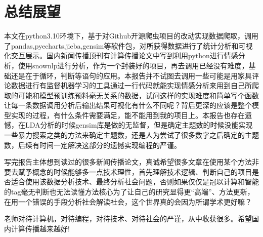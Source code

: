 \section{总结展望}
\par{本文在python3.10环境下，基于对Github开源爬虫项目的改动实现数据爬取，调用了pandas,pyecharts,jieba,gensim等软件包，对所获得数据进行了统计分析和可视化交互展示。国内新闻传播顶刊有计算传播论文中写到利用python进行情感分析，使用snownlp进行分析，作为一个封装好的项目，再去调用已经没有难度，基础还是在于循环，判断等语句的应用。本报告并不试图去调用一些可能是用家具评论数据进行有监督机器学习的工具通过一行代码就能实现情感分析来用到自己所爬取的可能和模型预训练预料毫无关系的数据，试问这样的实现难度和简单写个函数让每一条数据调用分析后输出结果可视化有什么不同呢？背后更深的应该是整个模型实现的过程，有什么条件需要满足，能不能用到我的项目上。本报告也存在遗憾，在LDA分析的时候gensim库是做的无监督，但是确定主题数的时候没能实现一些暴力搜索之类的方法来确定主题数，还是人为尝试了很多数字之后确定的主题数，后续有时间一定解决这部分的遗憾实现编程的严谨。}
\par{写完报告主体想到读过的很多新闻传播论文，真诚希望很多文章在使用某个方法非要去赋予概念的时候能够多一点技术理性，首先理解技术逻辑、判断自己的项目是否适合使用该数据分析技术、最终分析社会问题，否则如果仅仅是冠以计算和智能的tag毫无判断也无法读懂方法核心为了让自己的研究显得更“高端”、方法更新，在用一个错误的手段分析社会解读社会，这个世界真的会因为所谓学术更好嘛？}
\par{老师对待计算机，对待编程，对待技术、对待社会的严谨，从中收获很多。希望国内计算传播越来越好!}
